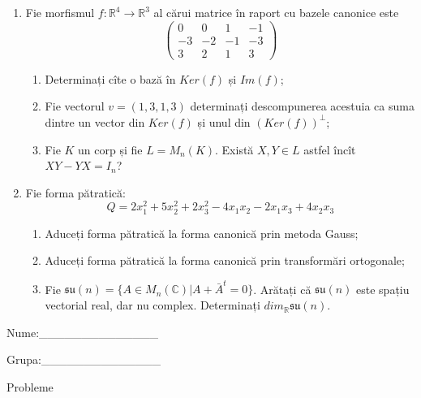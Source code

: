 \documentclass{article}
\begin{document}
\begin{enumerate}
 \item Fie morfismul $f:\mathbb{R}^4 \to \mathbb{R}^3$ al cărui matrice în raport cu bazele canonice este
$$\begin{pmatrix}
0&0&1&-1\\
-3&-2&-1&-3\\
3&2&1&3
\end{pmatrix}$$

\begin{enumerate}
\item Determinați cîte o bază în $Ker(f)$ și $Im(f)$;
\item Fie vectorul $v=(1,3,1,3)$ determinați descompunerea acestuia ca suma dintre un vector din $Ker(f)$ și unul din $(Ker(f))^\perp$;
\item Fie $K$ un corp și fie $L=M_n(K)$. Există $X,Y \in L$ astfel încît $XY-YX=I_n$?  
\end{enumerate}
\item Fie forma pătratică:
$$Q= 2x_1^2+5x_2^2+2x_3^2-4x_1x_2-2x_1x_3+4x_2x_3$$

\begin{enumerate}
\item Aduceți forma pătratică la forma canonică prin metoda Gauss;
\item Aduceți forma pătratică la forma canonică prin transformări ortogonale;
\item Fie $\mathfrak{su}(n)=\{ A \in M_n(\mathbb{C}) | A+\bar{A}^t=0\}$. Arătați că $\mathfrak{su}(n)$ este spațiu vectorial real, dar nu complex.
Determinați $dim_{\mathbb{R}}\mathfrak{su}(n)$.
\end{enumerate}
\end{enumerate}
\newpage
\begin{flushright}
Nume:\_\_\_\_\_\_\_\_\_\_\_\_\_\_
 
 
Grupa:\_\_\_\_\_\_\_\_\_\_\_\_\_\_
\end{flushright}
\begin{center}
\vspace{2cm}
{\Large Probleme}
\vspace{2cm}
\end{center}
\end{document}
